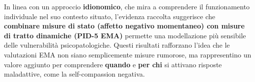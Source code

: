 \documentclass[
  11pt,
  a4paper,
  onecolumn]{article}
\begin{document}
In linea con un approccio \textbf{idionomico}, che mira a comprendere il
funzionamento individuale nel suo contesto situato, l'evidenza raccolta
suggerisce che \textbf{combinare misure di stato (affetto negativo
momentaneo) con misure di tratto dinamiche (PID-5 EMA)} permette una
modellazione più sensibile delle vulnerabilità psicopatologiche. Questi
risultati rafforzano l'idea che le valutazioni EMA non siano
semplicemente misure rumorose, ma rappresentino un valore aggiunto per
comprendere \textbf{quando} e \textbf{per chi} si attivano risposte
maladattive, come la self-compassion negativa.
\end{document}
